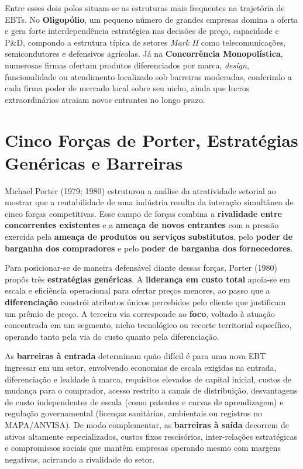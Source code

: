 Entre esses dois polos situam-se as estruturas mais frequentes na trajetória de EBTs. No \textbf{Oligopólio}, um pequeno número de grandes empresas domina a oferta e gera forte interdependência estratégica nas decisões de preço, capacidade e P\&D, compondo a estrutura típica de setores \textit{Mark II} como telecomunicações, semicondutores e defensivos agrícolas. Já na \textbf{Concorrência Monopolística}, numerosas firmas ofertam produtos diferenciados por marca, \textit{design}, funcionalidade ou atendimento localizado sob barreiras moderadas, conferindo a cada firma poder de mercado local sobre seu nicho, ainda que lucros extraordinários atraiam novos entrantes no longo prazo.

\section{Cinco Forças de Porter, Estratégias Genéricas e Barreiras}

Michael Porter (1979; 1980) estruturou a análise da atratividade setorial ao mostrar que a rentabilidade de uma indústria resulta da interação simultânea de cinco forças competitivas. Esse campo de forças combina a \textbf{rivalidade entre concorrentes existentes} e a \textbf{ameaça de novos entrantes} com a pressão exercida pela \textbf{ameaça de produtos ou serviços substitutos}, pelo \textbf{poder de barganha dos compradores} e pelo \textbf{poder de barganha dos fornecedores}.

Para posicionar-se de maneira defensável diante dessas forças, Porter (1980) propôs três \textbf{estratégias genéricas}. A \textbf{liderança em custo total} apoia-se em escala e eficiência operacional para ofertar preços menores, ao passo que a \textbf{diferenciação} constrói atributos únicos percebidos pelo cliente que justificam um prêmio de preço. A terceira via corresponde ao \textbf{foco}, voltado à atuação concentrada em um segmento, nicho tecnológico ou recorte territorial específico, operando tanto pela via do custo quanto pela diferenciação.

As \textbf{barreiras à entrada} determinam quão difícil é para uma nova EBT ingressar em um setor, envolvendo economias de escala exigidas na entrada, diferenciação e lealdade à marca, requisitos elevados de capital inicial, custos de mudança para o comprador, acesso restrito a canais de distribuição, desvantagens de custo independentes de escala (como patentes e curvas de aprendizagem) e regulação governamental (licenças sanitárias, ambientais ou registros no MAPA/ANVISA). De modo complementar, as \textbf{barreiras à saída} decorrem de ativos altamente especializados, custos fixos rescisórios, inter-relações estratégicas e compromissos sociais que mantêm empresas operando mesmo com margens negativas, acirrando a rivalidade do setor.

